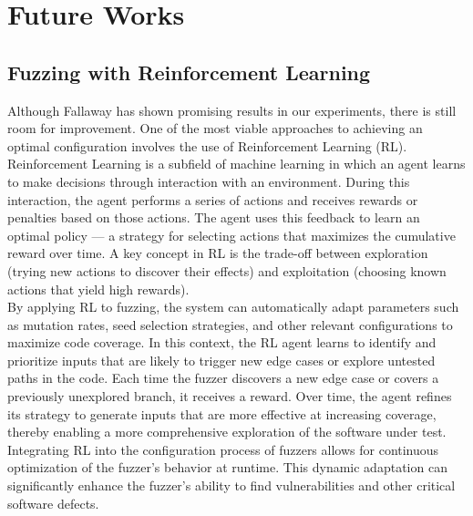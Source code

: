 \chapter{Future Works} 

\section{Fuzzing with Reinforcement Learning}
Although Fallaway has shown promising results in our experiments, there is still room for improvement. One of the most viable approaches to achieving an optimal configuration involves the use of Reinforcement Learning (RL).
\\Reinforcement Learning is a subfield of machine learning in which an agent learns to make decisions through interaction with an environment. During this interaction, the agent performs a series of actions and receives rewards or penalties based on those actions. The agent uses this feedback to learn an optimal policy — a strategy for selecting actions that maximizes the cumulative reward over time. A key concept in RL is the trade-off between exploration (trying new actions to discover their effects) and exploitation (choosing known actions that yield high rewards).
\\By applying RL to fuzzing, the system can automatically adapt parameters such as mutation rates, seed selection strategies, and other relevant configurations to maximize code coverage. In this context, the RL agent learns to identify and prioritize inputs that are likely to trigger new edge cases or explore untested paths in the code. Each time the fuzzer discovers a new edge case or covers a previously unexplored branch, it receives a reward. Over time, the agent refines its strategy to generate inputs that are more effective at increasing coverage, thereby enabling a more comprehensive exploration of the software under test.
\\Integrating RL into the configuration process of fuzzers allows for continuous optimization of the fuzzer’s behavior at runtime. This dynamic adaptation can significantly enhance the fuzzer's ability to find vulnerabilities and other critical software defects.

